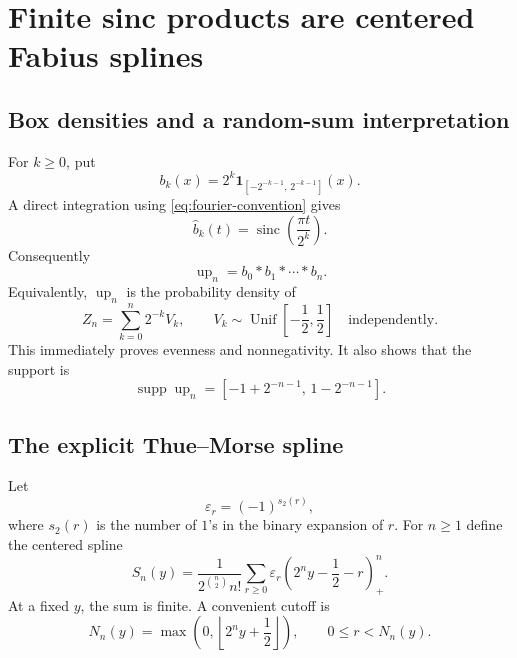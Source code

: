\documentclass[11pt]{article}
\newcommand{\upf}{\operatorname{up}}
\newcommand{\sinc}{\operatorname{sinc}}
\newcommand{\eps}{\varepsilon}
\newcommand{\pospart}[1]{\left(#1\right)_{+}}
\begin{document}
\section{Finite sinc products are centered Fabius splines}

\subsection{Box densities and a random-sum interpretation}

For $k\ge0$, put
\begin{equation}
 b_k(x)=2^k\mathbf 1_{[-2^{-k-1},\,2^{-k-1}]}(x).
 \label{eq:box-density}
\end{equation}
A direct integration using \eqref{eq:fourier-convention} gives
\begin{equation}
 \widehat b_k(t)=\sinc\!\left(\frac{\pi t}{2^k}\right).
 \label{eq:box-transform}
\end{equation}
Consequently
\begin{equation}
 \upf_n=b_0*b_1*\cdots*b_n.
 \label{eq:finite-convolution}
\end{equation}
Equivalently, $\upf_n$ is the probability density of
\begin{equation}
 Z_n=\sum_{k=0}^{n}2^{-k}V_k,
 \qquad V_k\sim\operatorname{Unif}\!\left[-\frac12,\frac12\right]
 \quad\text{independently}.
 \label{eq:Zn}
\end{equation}
This immediately proves evenness and nonnegativity.  It also shows that the
support is
\begin{equation}
 \operatorname{supp}\upf_n
 =\left[-1+2^{-n-1},\,1-2^{-n-1}\right].
 \label{eq:finite-support}
\end{equation}

\subsection{The explicit Thue--Morse spline}

Let
\begin{equation}
 \eps_r=(-1)^{s_2(r)},
 \label{eq:thue-morse}
\end{equation}
where $s_2(r)$ is the number of $1$'s in the binary expansion of $r$.  For
$n\ge1$ define the centered spline
\begin{equation}
 S_n(y)=\frac{1}{2^{\binom n2}n!}
 \sum_{r\ge0}\eps_r\pospart{2^ny-\frac12-r}^{n}.
 \label{eq:centered-spline}
\end{equation}
At a fixed $y$, the sum is finite.  A convenient cutoff is
\begin{equation}
 N_n(y)=\max\!\left(0,\left\lfloor2^ny+\frac12\right\rfloor\right),
 \qquad 0\le r<N_n(y).
 \label{eq:spline-cutoff}
\end{equation}
\end{document}
